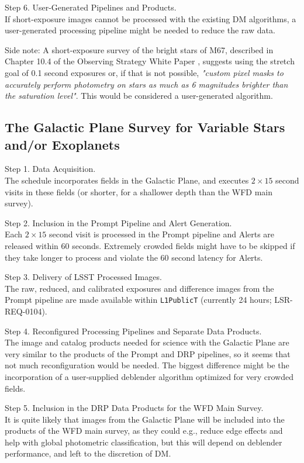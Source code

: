 \documentclass[DM,lsstdoc,toc]{lsstdoc}
\begin{document}
Step 6. User-Generated Pipelines and Products. \\
If short-exposure images cannot be processed with the existing DM algorithms, a user-generated processing pipeline might be needed to reduce the raw data. 

Side note: A short-exposure survey of the bright stars of M67, described in Chapter 10.4 of the Observing Strategy White Paper \citep{2017arXiv170804058L}, suggests using the stretch goal of 0.1 second exposures or, if that is not possible, \textit{"custom pixel masks to accurately perform photometry on stars as much as 6 magnitudes brighter than the saturation level"}. This would be considered a user-generated algorithm.

\subsection{The Galactic Plane Survey for Variable Stars and/or Exoplanets}\label{ssec:SPCS_GPVSEx}

Step 1. Data Acquisition. \\
The schedule incorporates fields in the Galactic Plane, and executes $2\times15$ second visits in these fields (or shorter, for a shallower depth than the WFD main survey).

Step 2. Inclusion in the Prompt Pipeline and Alert Generation. \\
Each $2\times15$ second visit is processed in the Prompt pipeline and Alerts are released within 60 seconds. Extremely crowded fields might have to be skipped if they take longer to process and violate the $60$ second latency for Alerts. 

Step 3. Delivery of LSST Processed Images. \\
The raw, reduced, and calibrated exposures and difference images from the Prompt pipeline are made available within  \texttt{L1PublicT} (currently 24 hours; LSR-REQ-0104).

Step 4. Reconfigured Processing Pipelines and Separate Data Products. \\
The image and catalog products needed for science with the Galactic Plane are very similar to the products of the Prompt and DRP pipelines, so it seems that not much reconfiguration would be needed. The biggest difference might be the incorporation of a user-supplied deblender algorithm optimized for very crowded fields.

Step 5. Inclusion in the DRP Data Products for the WFD Main Survey. \\
It is quite likely that images from the Galactic Plane will be included into the products of the WFD main survey, as they could e.g., reduce edge effects and help with global photometric classification, but this will depend on deblender performance, and left to the discretion of DM. 
\end{document}
